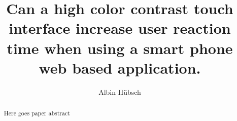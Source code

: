 \documentclass[runningheads,a4paper]{llncs}
\begin{document}
\pagestyle{headings}

\mainmatter


\title{Can a high color contrast touch interface increase user reaction time when using a smart phone web based application.}





\author{Albin Hübsch}


\maketitle

%
\begin{abstract}
Here goes paper abstract
\end{abstract}
%
\end{document}
